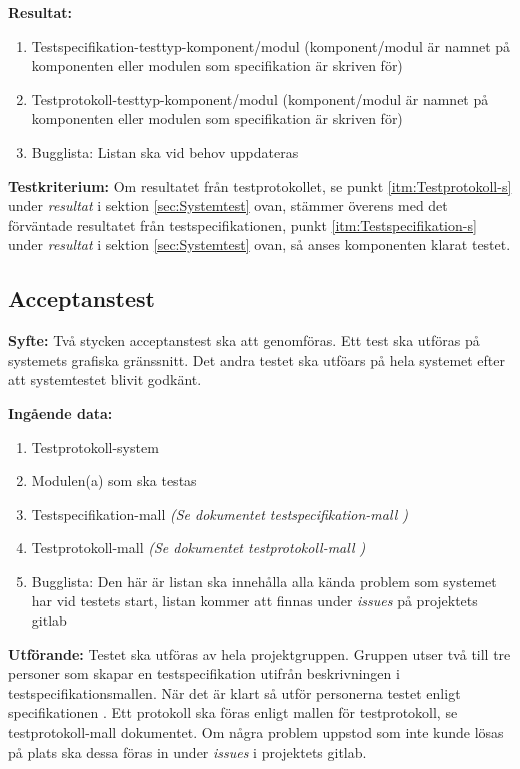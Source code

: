 \documentclass[a4paper,10pt]{article}
\begin{document}
\textbf{Resultat:}
    \begin{enumerate}
        \item \label{itm:Testspecifikation-s}
        Testspecifikation-testtyp-komponent/modul (komponent/modul är namnet på
        komponenten eller modulen som specifikation är skriven för)
        \item \label{itm:Testprotokoll-s} Testprotokoll-testtyp-komponent/modul
        (komponent/modul är namnet på komponenten eller modulen som
        specifikation är skriven för)
        \item Bugglista: Listan ska vid behov uppdateras
    \end{enumerate}

\textbf{Testkriterium:} Om resultatet från testprotokollet, se punkt
\ref{itm:Testprotokoll-s} under \emph{resultat} i sektion \ref{sec:Systemtest}
ovan, stämmer överens med det förväntade resultatet från testspecifikationen,
punkt \ref{itm:Testspecifikation-s} under \emph{resultat} i sektion
\ref{sec:Systemtest} ovan, så anses komponenten klarat testet.

\subsection{Acceptanstest}
\textbf{Syfte:}
Två stycken acceptanstest ska att genomföras. Ett test ska utföras på systemets
grafiska gränssnitt.  Det andra testet ska utföars på hela systemet efter att
systemtestet blivit godkänt.

\textbf{Ingående data:}
        \begin{enumerate}
            \item Testprotokoll-system
            \item Modulen(a) som ska testas
            \item Testspecifikation-mall
            \emph{(Se dokumentet testspecifikation-mall \cite{testspec-mall})}
            \item Testprotokoll-mall \emph{(Se
            dokumentet testprotokoll-mall \cite{testprot-mall})}
            \item Bugglista: Den här är listan ska innehålla alla kända problem
            som systemet har vid testets start, listan kommer att finnas under
            \emph{issues} på projektets gitlab
        \end{enumerate}

\textbf{Utförande:} Testet ska utföras av hela projektgruppen. Gruppen utser
två till tre personer som skapar en testspecifikation utifrån beskrivningen i
testspecifikationsmallen. När det är klart så utför personerna testet enligt
specifikationen \cite{kravspec}. Ett protokoll ska föras enligt mallen för
testprotokoll, se testprotokoll-mall dokumentet. Om några problem uppstod som
inte kunde lösas på plats ska dessa föras in under \emph{issues} i projektets
gitlab.
\end{document}
